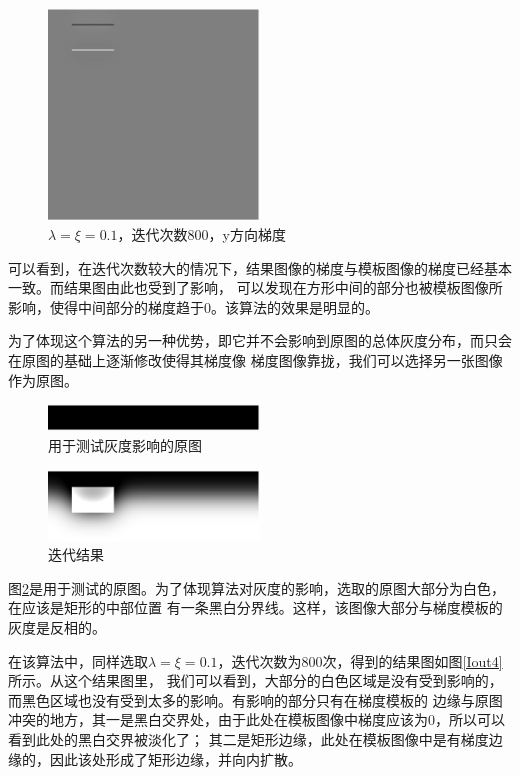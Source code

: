\begin{figure}[h!]
\center
\includegraphics[width=0.5\textwidth]{figure/gradtest/Iouty3}
\caption{$\lambda=\xi=0.1$，迭代次数800，y方向梯度}\label{fig:Iouty3}
\end{figure}
可以看到，在迭代次数较大的情况下，结果图像的梯度与模板图像的梯度已经基本一致。而结果图由此也受到了影响，
可以发现在方形中间的部分也被模板图像所影响，使得中间部分的梯度趋于$0$。该算法的效果是明显的。

为了体现这个算法的另一种优势，即它并不会影响到原图的总体灰度分布，而只会在原图的基础上逐渐修改使得其梯度像
梯度图像靠拢，我们可以选择另一张图像作为原图。
\begin{figure}[h!]
\center
\includegraphics[width=0.5\textwidth]{figure/gradtest/I4}
\caption{用于测试灰度影响的原图}\label{fig:I4}
\end{figure}
\begin{figure}[h!]
\center
\includegraphics[width=0.5\textwidth]{figure/gradtest/Iout4}
\caption{迭代结果}\label{fig:Iout4}
\end{figure}
图\ref{fig:I4}是用于测试的原图。为了体现算法对灰度的影响，选取的原图大部分为白色，在应该是矩形的中部位置
有一条黑白分界线。这样，该图像大部分与梯度模板的灰度是反相的。

在该算法中，同样选取$\lambda=\xi=0.1$，迭代次数为$800$次，得到的结果图如图\ref{Iout4}所示。从这个结果图里，
我们可以看到，大部分的白色区域是没有受到影响的，而黑色区域也没有受到太多的影响。有影响的部分只有在梯度模板的
边缘与原图冲突的地方，其一是黑白交界处，由于此处在模板图像中梯度应该为$0$，所以可以看到此处的黑白交界被淡化了；
其二是矩形边缘，此处在模板图像中是有梯度边缘的，因此该处形成了矩形边缘，并向内扩散。

